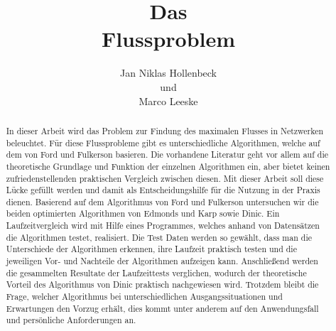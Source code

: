 \documentclass[a4paper]{llncs}
\begin{document}
\mainmatter  %

\title{Das \\ Flussproblem}


%
%
\author{Jan Niklas Hollenbeck \\ und \\ Marco Leeske}
\maketitle


\begin{abstract}

In dieser Arbeit wird das Problem zur Findung des maximalen
Flusses in Netzwerken beleuchtet.
Für diese Flussprobleme gibt es unterschiedliche Algorithmen, welche auf dem von Ford und Fulkerson basieren.
 Die vorhandene Literatur geht vor allem auf die theoretische Grundlage und Funktion der einzelnen Algorithmen ein,  aber bietet keinen zufriedenstellenden praktischen Vergleich zwischen diesen.
 Mit dieser Arbeit soll diese Lücke gefüllt werden und damit als Entscheidungshilfe für die Nutzung in der Praxis dienen.
Basierend auf dem Algorithmus von Ford und Fulkerson untersuchen wir die beiden optimierten Algorithmen von Edmonds und Karp sowie Dinic.
Ein Laufzeitvergleich wird mit Hilfe eines Programmes, welches anhand von Datensätzen die Algorithmen testet, realisiert.
Die Test Daten werden so gewählt, dass man die Unterschiede der Algorithmen erkennen, ihre Laufzeit praktisch testen und die jeweiligen Vor- und Nachteile der Algorithmen aufzeigen kann.
Anschließend werden die gesammelten Resultate der Laufzeittests verglichen,
wodurch der theoretische Vorteil des Algorithmus von Dinic praktisch nachgewiesen wird.
 Trotzdem bleibt die Frage, welcher Algorithmus bei unterschiedlichen Ausgangssituationen und Erwartungen den Vorzug erhält, dies kommt unter anderem auf den Anwendungsfall und persönliche Anforderungen an.

\end{abstract}
\end{document}
